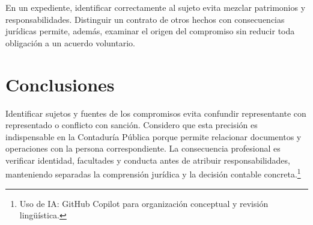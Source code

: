 {En un expediente, identificar correctamente al sujeto evita mezclar patrimonios y responsabilidades. Distinguir un contrato de otros hechos con consecuencias jurídicas permite, además, examinar el origen del compromiso sin reducir toda obligación a un acuerdo voluntario.

\clearpage
\section{Conclusiones}
Identificar sujetos y fuentes de los compromisos evita confundir representante con representado o conflicto con sanción. Considero que esta precisión es indispensable en la Contaduría Pública porque permite relacionar documentos y operaciones con la persona correspondiente. La consecuencia profesional es verificar identidad, facultades y conducta antes de atribuir responsabilidades, manteniendo separadas la comprensión jurídica y la decisión contable concreta.\footnote{Uso de IA: GitHub Copilot para organización conceptual y revisión lingüística.}
\clearpage
}
